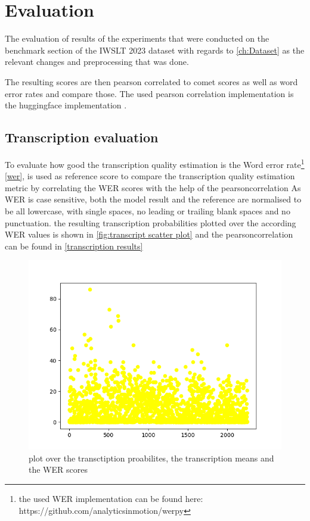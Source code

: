 
\chapter{Evaluation}
\label{ch:Evaluation}
The evaluation of results of the experiments that were conducted on the benchmark section of the IWSLT 2023 dataset \cite{sperber2024evaluating} with regards to \autoref{ch:Dataset} as the relevant changes and preprocessing that was done.

The resulting scores are then pearson correlated \cite{2020SciPy-NMeth} to comet scores as well as word error rates and compare those. The used pearson correlation implementation is the huggingface implementation \cite{huggingfacepearsonr}.


\section{Transcription evaluation}
To evaluate how good the transcription quality estimation is the Word error rate\footnote{the used WER implementation can be found here: https://github.com/analyticsinmotion/werpy} \autoref{wer}, is used as reference score to compare the transcription quality estimation metric by correlating the WER scores with the help of the pearsoncorrelation \cite{2020SciPy-NMeth}
As WER is case sensitive, both the model result and the reference are normalised to be all lowercase, with single spaces, no leading or trailing blank spaces and no punctuation.
the resulting transcription probabilities plotted over the according WER values is shown in \autoref{fig:transcript scatter plot} and the pearsoncorrelation can be found in \autoref{transcription results}
\begin{figure}
    \centering%
    \includegraphics[width=0.5\linewidth]{Latex/sections/images/werref.png}
    \caption{plot over the transctiption proabilites, the transcription means and the WER scores}
    \label{fig:transcript scatter plot}
\end{figure}

